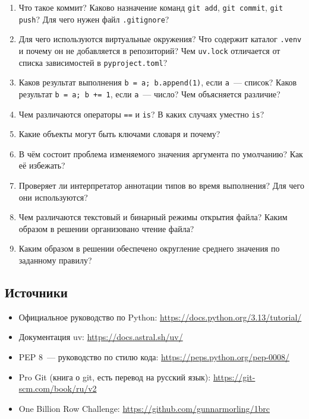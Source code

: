 \documentclass[11pt,a4paper]{article}
\newcommand{\code}[1]{\texttt{#1}}
\begin{document}
\begin{enumerate}
  \item Что такое коммит? Каково назначение команд \code{git add}, \code{git commit}, \code{git push}?
        Для чего нужен файл \code{.gitignore}?
  \item Для чего используются виртуальные окружения? Что содержит каталог \code{.venv} и почему
        он не добавляется в репозиторий? Чем \code{uv.lock} отличается от списка зависимостей
        в \code{pyproject.toml}?
  \item Каков результат выполнения \code{b = a; b.append(1)}, если \code{a}~— список?
        Каков результат \code{b = a; b += 1}, если \code{a}~— число? Чем объясняется различие?
  \item Чем различаются операторы \code{==} и \code{is}? В каких случаях уместно \code{is}?
  \item Какие объекты могут быть ключами словаря и почему?
  \item В чём состоит проблема изменяемого значения аргумента по умолчанию? Как её избежать?
  \item Проверяет ли интерпретатор аннотации типов во время выполнения? Для чего они используются?
  \item Чем различаются текстовый и бинарный режимы открытия файла? Каким образом в решении
        организовано чтение файла?
  \item Каким образом в решении обеспечено округление среднего значения по заданному правилу?
\end{enumerate}

\subsection*{Источники}
\begin{itemize}
  \item Официальное руководство по Python: \url{https://docs.python.org/3.13/tutorial/}
  \item Документация uv: \url{https://docs.astral.sh/uv/}
  \item PEP 8~— руководство по стилю кода: \url{https://peps.python.org/pep-0008/}
  \item Pro Git (книга о git, есть перевод на русский язык): \url{https://git-scm.com/book/ru/v2}
  \item One Billion Row Challenge: \url{https://github.com/gunnarmorling/1brc}
\end{itemize}
\end{document}
